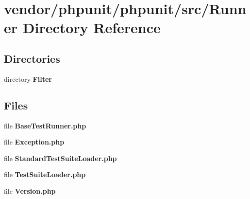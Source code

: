 \section{vendor/phpunit/phpunit/src/\+Runner Directory Reference}
\label{dir_6b43551af88c5c30621fcecb70d9a0dd}
\subsection*{Directories}
\begin{DoxyCompactItemize}
\item 
directory {\bf Filter}
\end{DoxyCompactItemize}
\subsection*{Files}
\begin{DoxyCompactItemize}
\item 
file {\bf Base\+Test\+Runner.\+php}
\item 
file {\bf Exception.\+php}
\item 
file {\bf Standard\+Test\+Suite\+Loader.\+php}
\item 
file {\bf Test\+Suite\+Loader.\+php}
\item 
file {\bf Version.\+php}
\end{DoxyCompactItemize}
